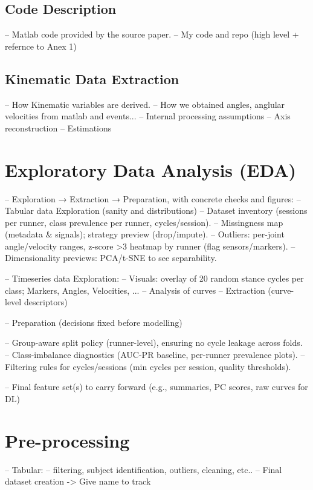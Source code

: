 \subsection{Code Description}\label{subsec:method-code-description}
-- Matlab code provided by the source paper.
-- My code and repo (high level + refernce to Anex 1)

\subsection{Kinematic Data Extraction}\label{subsec:kinematic-data-extraction}
-- How Kinematic variables are derived.
-- How we obtained angles, anglular velocities from matlab and events...
-- Internal processing assumptions
-- Axis reconstruction
-- Estimations



\section{Exploratory Data Analysis (EDA)}\label{sec:method-eda}
-- Exploration → Extraction → Preparation, with concrete checks and figures:
-- Tabular data Exploration (sanity and distributions)
-- Dataset inventory (sessions per runner, class prevalence per runner, cycles/session).
-- Missingness map (metadata \& signals); strategy preview (drop/impute).
-- Outliers: per-joint angle/velocity ranges, z-score >3 heatmap by runner (flag sensors/markers).
-- Dimensionality previews: PCA/t-SNE to see separability.


-- Timeseries data Exploration:
-- Visuals: overlay of 20 random stance cycles per class; Markers, Angles, Velocities, ...
-- Analysis of curves
-- Extraction (curve-level descriptors)


-- Preparation (decisions fixed before modelling)

-- Group-aware split policy (runner-level), ensuring no cycle leakage across folds.
-- Class-imbalance diagnostics (AUC-PR baseline, per-runner prevalence plots).
-- Filtering rules for cycles/sessions (min cycles per session, quality thresholds).

-- Final feature set(s) to carry forward (e.g., summaries, PC scores, raw curves for DL)



\section{Pre-processing}\label{sec:method-preprocessing}
-- Tabular:
    -- filtering, subject identification, outliers, cleaning, etc..
    -- Final dataset creation -> Give name to track


